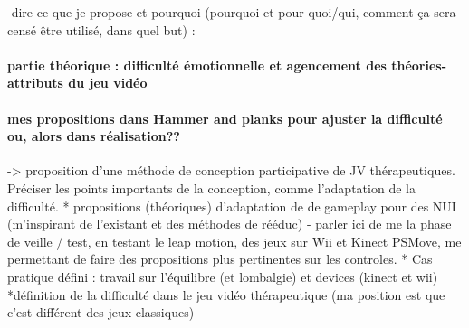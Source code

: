 	-dire ce que je propose et pourquoi (pourquoi et pour quoi/qui, comment ça sera censé être utilisé, dans quel but) :
	\paragraph{partie théorique : difficulté émotionnelle et agencement des théories-attributs du jeu vidéo}
	\paragraph{mes propositions dans Hammer and planks pour ajuster la difficulté ou, alors dans réalisation??}
-> proposition d'une méthode de conception participative de JV thérapeutiques. Préciser les points importants de la conception, comme l'adaptation de la difficulté.
* propositions (théoriques) d'adaptation de de gameplay pour des NUI (m'inspirant de l'existant et des méthodes de rééduc)
	- parler ici de me la phase de veille / test, en testant le leap motion, des jeux sur Wii et Kinect PSMove, me permettant de faire des propositions plus pertinentes sur les controles.
* Cas pratique défini : travail sur l'équilibre (et lombalgie) et devices (kinect et wii)
*définition de la difficulté dans le jeu vidéo thérapeutique (ma position est que c'est différent des jeux classiques)